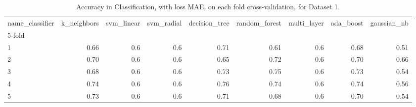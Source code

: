 \begin{table}
\centering
\caption{Accuracy in Classification, with loss MAE, on each fold cross-validation, for Dataset 1.}
\label{table:acc-mae-boon-fold-2}
\begin{tabular}{lrrrrrrrr}
\toprule
name\_classifier &  k\_neighbors &  svm\_linear &  svm\_radial &  decision\_tree &  random\_forest &  multi\_layer &  ada\_boost &  gaussian\_nb \\
5-fold &              &             &             &                &                &              &            &              \\
\midrule
1      &         0.66 &         0.6 &         0.6 &           0.71 &           0.61 &          0.6 &       0.68 &         0.51 \\
2      &         0.70 &         0.6 &         0.6 &           0.65 &           0.72 &          0.6 &       0.70 &         0.66 \\
3      &         0.68 &         0.6 &         0.6 &           0.73 &           0.75 &          0.6 &       0.73 &         0.54 \\
4      &         0.74 &         0.6 &         0.6 &           0.76 &           0.74 &          0.6 &       0.74 &         0.56 \\
5      &         0.73 &         0.6 &         0.6 &           0.71 &           0.68 &          0.6 &       0.70 &         0.54 \\
\bottomrule
\end{tabular}
\end{table}
